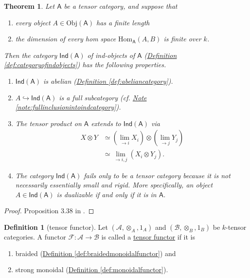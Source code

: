\documentclass[a4paper,10pt]{scrreprt}
\newcommand{\defn}[1]{\ul{#1}}
\newcommand{\Obj}{\mathrm{Obj}}
\newcommand{\Hom}{\mathrm{Hom}}
\theoremstyle{definition}
\newtheorem{definition}{Definition}[section]
\theoremstyle{plain}
\newtheorem{theorem}{Theorem}[section]
\theoremstyle{remark}
\begin{document}
\begin{theorem}
  Let $\mathsf{A}$ be a tensor category, and suppose that
  \begin{enumerate}
    \item every object $A \in \Obj(\mathsf{A})$ has a finite length

    \item the dimension of every hom space $\Hom_{\mathsf{A}}(A, B)$ is finite over $k$.
  \end{enumerate}

  Then the category $\mathsf{Ind}(\mathsf{A})$ of ind-objects of $\mathsf{A}$ (\hyperref[def:categoryofindobjects]{Definition \ref*{def:categoryofindobjects}}) has the following properties.
  \begin{enumerate}
    \item $\mathsf{Ind}(\mathsf{A})$ is abelian (\hyperref[def:abeliancategory]{Definition \ref*{def:abeliancategory}}).

    \item $A \hookrightarrow \mathsf{Ind}(\mathsf{A})$ is a full subcategory (cf. \hyperref[note:fullinclusionintoindcategory]{Note \ref*{note:fullinclusionintoindcategory}}).

    \item The tensor product on $\mathsf{A}$ extends to $\mathsf{Ind}(\mathsf{A})$ via
      \begin{align*}
        X \otimes Y &\simeq (\lim_{\rightarrow i}X_{i}) \otimes (\lim_{\rightarrow j}Y_{j}) \\
        &\simeq \lim_{\rightarrow i,j} (X_{i} \otimes Y_{j}).
      \end{align*}

    \item The category $\mathsf{Ind}(\mathsf{A})$ fails only to be a tensor category because it is not necessarily essentially small and rigid. More specifically, an object $A \in \mathsf{Ind}(\mathsf{A})$ is dualizable if and only if it is in $\mathsf{A}$.
  \end{enumerate}
\end{theorem}
\begin{proof}
  Proposition 3.38 in \cite{nlab-deligne-theorem}.
\end{proof}

\begin{definition}[tensor functor]
  \label{def:tensorfunctor}
  Let $(\mathscr{A}, \otimes_{A}, 1_{A})$ and $(\mathscr{B}, \otimes_{B}, 1_{B})$ be $k$-tensor categories. A functor $\mathcal{F}\colon \mathscr{A} \to \mathscr{B}$ is called a \defn{tensor functor} if it is
  \begin{enumerate}
    \item braided (\hyperref[def:braidedmonoidalfunctor]{Definition \ref*{def:braidedmonoidalfunctor}}) and

    \item strong monoidal (\hyperref[def:monoidalfunctor]{Definition \ref*{def:monoidalfunctor}}).
  \end{enumerate}
\end{definition}
\end{document}
